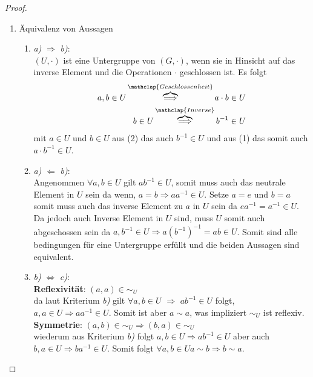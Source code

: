 \documentclass{../problemset}
\begin{document}
\begin{problem}
\begin{proof}
	\begin{enumerate}
		\item Äquivalenz von Aussagen
		      \begin{enumerate}[label=\alph*)]
			      \item \textit{a)} $\Longrightarrow$ \textit{b)}: \\
			            $(U, \cdot)$ ist eine Untergruppe von $(G, \cdot)$, wenn sie in Hinsicht auf das inverse Element und die Operationen $\cdot$ geschlossen ist.
			            Es folgt \begin{align}
				            a, b \in U \overbrace{\Longrightarrow}^{\mathclap{Geschlossenheit}} a \cdot b \in U \\
				            b \in U \overbrace{\Longrightarrow}^{\mathclap{Inverse}} b^{-1} \in U
			            \end{align} mit $a \in U$ und $b \in U$ aus (2) das auch $b^{-1} \in U$ und aus (1) das somit auch $a \cdot b^{-1} \in U$.
			            \checkmark
			      \item \textit{a)} $\Longleftarrow$ \textit{b)}: \\
			            Angenommen $\forall a,b \in U$ gilt $ab^{-1} \in U$, somit muss auch das neutrale Element in $U$ sein da wenn, $a=b \Longrightarrow aa^{-1} \in U$.
			            Setze $a=e$ und $b=a$ somit muss auch das inverse Element zu $a$ in $U$ sein da $ea^{-1} = a^{-1} \in U$.
			            Da jedoch auch Inverse Element in $U$ sind, muss $U$ somit auch abgeschossen sein da $a,b^{-1} \in U \Longrightarrow a{(b^{-1})}^{-1} = ab \in U$.
			            Somit sind alle bedingungen für eine Untergruppe erfüllt und die beiden Aussagen sind equivalent.
			      \item \textit{b)} $\Longleftrightarrow$ \textit{c)}: \\
			            \textbf{Reflexivität}: $(a, a) \in \sim_U$ \\
			            da laut Kriterium \textit{b)} gilt $\forall a,b \in U$ $\Longrightarrow$ $ab^{-1} \in U$ folgt,
			            $a, a \in U \Longrightarrow aa^{-1} \in U$. Somit ist aber $a \sim a$, was impliziert $\sim_U$ ist reflexiv.
			            \checkmark \\
			            \textbf{Symmetrie}: $(a, b) \in \sim_U \Longrightarrow (b,a) \in \sim_U$ \\
			            wiederum aus Kriterium \textit{b)} folgt $a, b \in U \Longrightarrow ab^{-1} \in U$ aber auch $b,a \in U \Longrightarrow ba^{-1} \in U$.
			            Somit folgt $\forall a,b \in U a \sim b \Longrightarrow b \sim a$.
			            \checkmark \\

		      \end{enumerate}

	\end{enumerate}
\end{proof}


\end{problem}
\end{document}

